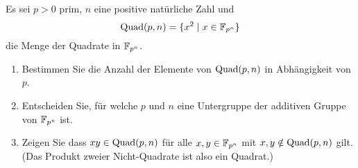 \begin{question}[subtitle = Quadrate in endlichen Körpern]
  Es sei $p > 0$ prim, $n$ eine positive natürliche Zahl und
  \[
    \operatorname{Quad}(p,n) = \{x^2 \mid x \in \mathbb{F}_{p^n}\}
  \]
  die Menge der Quadrate in $\mathbb{F}_{p^n}$.
  \begin{enumerate}
    \item
      Bestimmen Sie die Anzahl der Elemente von $\operatorname{Quad}(p,n)$ in Abhängigkeit von $p$.
    \item
      Entscheiden Sie, für welche $p$ und $n$ eine Untergruppe der additiven Gruppe von $\mathbb{F}_{p^n}$ ist.
    \item
      Zeigen Sie dass $xy \in \operatorname{Quad}(p,n)$ für alle $x, y \in \mathbb{F}_{p^n}$ mit $x, y \notin \operatorname{Quad}(p,n)$ gilt.
      (Das Produkt zweier Nicht-Quadrate ist also ein Quadrat.)
  \end{enumerate}
\end{question}


